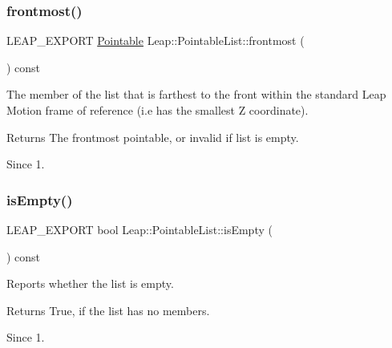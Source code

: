 \subsubsection{\texorpdfstring{frontmost()}{frontmost()}}
{\footnotesize\ttfamily L\+E\+A\+P\+\_\+\+E\+X\+P\+O\+RT \hyperlink{class_leap_1_1_pointable}{Pointable} Leap\+::\+Pointable\+List\+::frontmost (\begin{DoxyParamCaption}{ }\end{DoxyParamCaption}) const}

The member of the list that is farthest to the front within the standard Leap Motion frame of reference (i.\+e has the smallest Z coordinate).


\begin{DoxyCodeInclude}
\end{DoxyCodeInclude}


\begin{DoxyReturn}{Returns}
The frontmost pointable, or invalid if list is empty. 
\end{DoxyReturn}
\begin{DoxySince}{Since}
1. 
\end{DoxySince}
\mbox{\label{class_leap_1_1_pointable_list_a42ea882e4e9562e59c75604d6a2ca64a}} 
\subsubsection{\texorpdfstring{is\+Empty()}{isEmpty()}}
{\footnotesize\ttfamily L\+E\+A\+P\+\_\+\+E\+X\+P\+O\+RT bool Leap\+::\+Pointable\+List\+::is\+Empty (\begin{DoxyParamCaption}{ }\end{DoxyParamCaption}) const}

Reports whether the list is empty.


\begin{DoxyCodeInclude}
\end{DoxyCodeInclude}


\begin{DoxyReturn}{Returns}
True, if the list has no members. 
\end{DoxyReturn}
\begin{DoxySince}{Since}
1. 
\end{DoxySince}
\mbox{\label{class_leap_1_1_pointable_list_a1f3565cc31a527a850eda34a5f2446c3}} 
